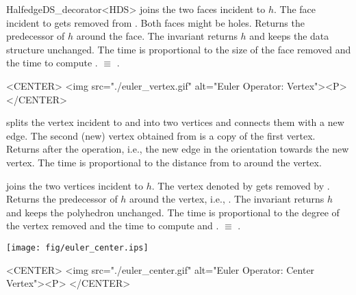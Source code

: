 \begin{ccRefClass}{HalfedgeDS_decorator<HDS>}
    {joins the two faces incident to $h$. The face incident to
       gets removed from . Both faces might be
    holes. Returns the predecessor of $h$ around the face. The invariant
     returns $h$ and keeps
    the data structure unchanged. The time is proportional to the size
    of the face removed and the time to compute .
    \ccPrecond {} $\equiv$ .}


\begin{ccHtmlOnly}
    <CENTER>
    <img src="./euler_vertex.gif" alt="Euler Operator: Vertex"><P>
    </CENTER>
\end{ccHtmlOnly}

    {splits the vertex incident to  and  into two vertices
     and connects them with a new edge. The second (new) vertex
     obtained from  is a copy of the first vertex. Returns
      after the operation, i.e., the new edge
     in the orientation towards the new vertex. The time is proportional 
     to the distance from  to  around the vertex.} 

    {joins the two vertices incident to $h$. The vertex denoted by
      gets removed by . Returns the predecessor of
     $h$ around the vertex, i.e., . The invariant 
      returns $h$
     and keeps the polyhedron unchanged. 
     The time is proportional to the degree of the vertex removed and 
     the time to compute  and .
     \ccPrecond {} $\equiv$ .}

\begin{ccTexOnly}
    \begin{center}
      \parbox{0.52\textwidth}{%
          \texttt{[image: fig/euler\_center.ips]}%
      }
    \end{center}
\end{ccTexOnly}

\begin{ccHtmlOnly}
    <CENTER>
    <img src="./euler_center.gif" alt="Euler Operator: Center Vertex"><P>
    </CENTER>
\end{ccHtmlOnly}


\end{ccRefClass}
